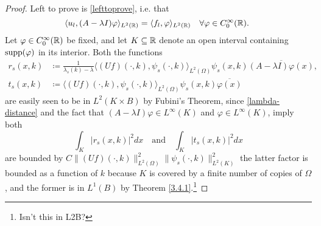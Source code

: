 \begin{theorem}
\begin{proof}
		Left to prove is \eqref{lefttoprove}, i.e. that
			\begin{equation}
				\langle u_{l} , (A - \lambda I) \varphi \rangle_{L^{2}(\R)} = \langle f_{l},\varphi \rangle_{L^{2}(\R)} \quad \forall \varphi \in C^{\infty}_{0}(\R). \label{lefttoshow2}
			\end{equation} 
		Let $\varphi \in C_{0}^{\infty}(\mathbb{R})$ be fixed, and let $K \subseteq \mathbb{R}$ denote an open interval containing $\operatorname{supp}(\varphi)$ in its interior. Both the functions
		\begin{align*}
			r_{s}(x, k) & \coloneqq \frac{1}{\lambda_{s}(k) - \lambda} \langle (Uf)(\cdot, k), \psi_{s}(\cdot, k) \rangle_{L^{2}(\Omega)} \psi_{s}(x, k) \overline{(A - \lambda I) \varphi(x)}, \\
			t_{s}(x, k) & \coloneqq \langle (Uf)(\cdot, k), \psi_{s}(\cdot, k) \rangle_{L^{2}(\Omega)} \psi_{s}(x, k) \overline{\varphi(x)}
		\end{align*}
		are easily seen to be in $L^{2}(K \times B)$ by Fubini's Theorem, since \eqref{lambda-distance} and the fact that $(A - \lambda I) \varphi \in L^{\infty}(K)$ and $\varphi \in L^{\infty}(K)$, imply both
		\[ \int_{K} |r_{s}(x, k)|^{2} dx \quad \text{and} \quad \int_{K} |t_{s}(x, k)|^{2} dx \]
		are bounded by $C \| (Uf)(\cdot, k) \|^{2}_{L^{2}(\Omega)} \| \psi_{s}(\cdot, k) \|^{2}_{L^{2}(K)}$ the latter factor is bounded as a function of $k$ because $K$ is covered by a finite number of copies of $\Omega$, and the former is in $L^{1}(B)$ by Theorem \ref{3.4.1}.\footnote{Isn't this in L2B?} %
		

\end{proof}
\end{theorem}
